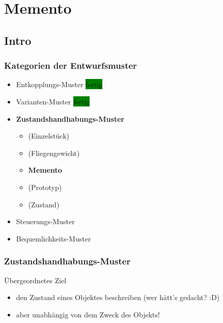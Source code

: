 \documentclass[18pt]{beamer}
\begin{document}
\section{Memento}
	\subsection{Intro}
	\begin{frame}
		\frametitle{Kategorien der Entwurfsmuster}
		\begin{itemize}
			\item Entkopplungs-Muster \colorbox{green}{fertig}
			\item Varianten-Muster \colorbox{green}{fertig}
			\item \textbf{Zustandshandhabungs-Muster}
				\begin{itemize}
					\item (Einzelstück)
					\item (Fliegengewicht)
					\item \textbf{Memento} 
					\item (Prototyp) 
					\item (Zustand)
				\end{itemize}
			\item Steuerungs-Muster
			\item Bequemlichkeits-Muster
		\end{itemize}
	\end{frame}

	\begin{frame}
		\frametitle{Zustandshandhabungs-Muster}
		\begin{block}{Übergeordnetes Ziel}
			\begin{itemize}
				\item den Zustand eines Objektes beschreiben (wer hätt's gedacht? :D) \pause 
				\item aber unabhängig von dem Zweck des Objekts!
			\end{itemize}
		\end{block}
	\end{frame}
\end{document}
